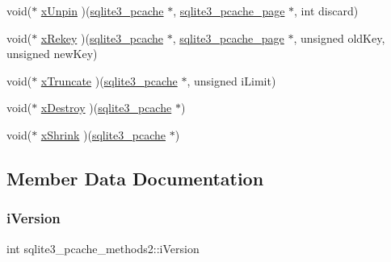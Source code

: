 \begin{DoxyCompactItemize}
void($\ast$ \mbox{\hyperlink{structsqlite3__pcache__methods2_a8fcb4ba48106aac8dfff247baea06e1a}{x\+Unpin}} )(\mbox{\hyperlink{sqlite3_8h_a096c453d937d51f7926d7d31c8e0bd2f}{sqlite3\+\_\+pcache}} $\ast$, \mbox{\hyperlink{structsqlite3__pcache__page}{sqlite3\+\_\+pcache\+\_\+page}} $\ast$, int discard)
\item 
void($\ast$ \mbox{\hyperlink{structsqlite3__pcache__methods2_ad5b7609bdc0d2ae80325f7925b76c0af}{x\+Rekey}} )(\mbox{\hyperlink{sqlite3_8h_a096c453d937d51f7926d7d31c8e0bd2f}{sqlite3\+\_\+pcache}} $\ast$, \mbox{\hyperlink{structsqlite3__pcache__page}{sqlite3\+\_\+pcache\+\_\+page}} $\ast$, unsigned old\+Key, unsigned new\+Key)
\item 
void($\ast$ \mbox{\hyperlink{structsqlite3__pcache__methods2_a711d60b1895622a10186a2894cef1383}{x\+Truncate}} )(\mbox{\hyperlink{sqlite3_8h_a096c453d937d51f7926d7d31c8e0bd2f}{sqlite3\+\_\+pcache}} $\ast$, unsigned i\+Limit)
\item 
void($\ast$ \mbox{\hyperlink{structsqlite3__pcache__methods2_a17a43db31d015c29e44d68c752682365}{x\+Destroy}} )(\mbox{\hyperlink{sqlite3_8h_a096c453d937d51f7926d7d31c8e0bd2f}{sqlite3\+\_\+pcache}} $\ast$)
\item 
void($\ast$ \mbox{\hyperlink{structsqlite3__pcache__methods2_a225971a193ff429d9f1339aca39c7755}{x\+Shrink}} )(\mbox{\hyperlink{sqlite3_8h_a096c453d937d51f7926d7d31c8e0bd2f}{sqlite3\+\_\+pcache}} $\ast$)
\end{DoxyCompactItemize}


\subsection{Member Data Documentation}
\mbox{\label{structsqlite3__pcache__methods2_a03b27be6c7cb8f1d2662c454cbe58483}} 
\subsubsection{\texorpdfstring{iVersion}{iVersion}}
{\footnotesize\ttfamily int sqlite3\+\_\+pcache\+\_\+methods2\+::i\+Version}

\mbox{\label{structsqlite3__pcache__methods2_aee83131f16bb88218d7b0339854719d6}} 
